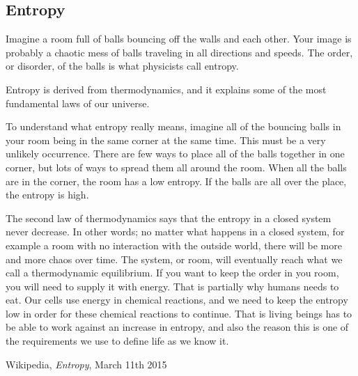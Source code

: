 \subsection*{Entropy}
Imagine a room full of balls bouncing off the walls and each other.
Your image is probably a chaotic mess of balls traveling in all directions and speeds.
The order, or disorder, of the balls is what physicists call entropy.

Entropy is derived from thermodynamics, and it explains some of the most fundamental laws of our universe.

To understand what entropy really means, imagine all of the bouncing balls in your room being in the same corner at the same time.
This must be a very unlikely occurrence.
There are few ways to place all of the balls together in one corner, but lots of ways to spread them all around the room.
When all the balls are in the corner, the room has a low entropy.
If the balls are all over the place, the entropy is high.


The second law of thermodynamics says that the entropy in a closed system never decrease.
In other words; no matter what happens in a closed system, for example a room with no interaction with the outside world, there will be more and more chaos over time.
The system, or room, will eventually reach what we call a thermodynamic equilibrium.
If you want to keep the order in you room, you will need to supply it with energy.
That is partially why humans needs to eat.
Our cells use energy in chemical reactions, and we need to keep the entropy low in order for these chemical reactions to continue.
That is living beings has to be able to work against an increase in entropy, and also the reason this is one of the requirements we use to define life as we know it.

\begin{thebibliography}{99}
		Wikipedia,
		\emph{Entropy},
		March 11th 2015
	\bibitem{}
\end{thebibliography}